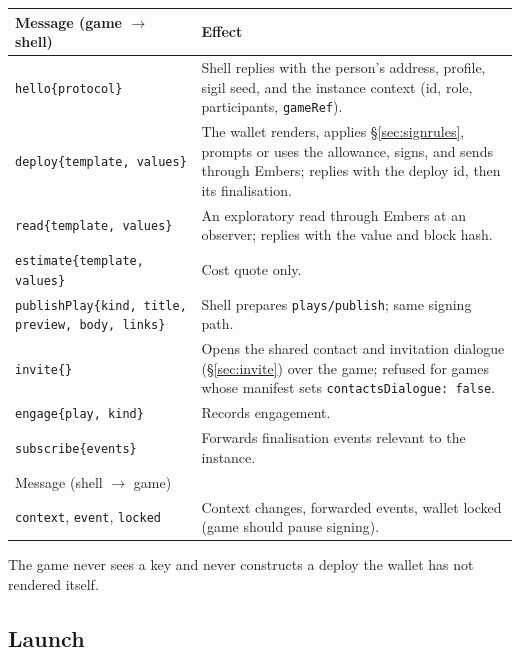 \documentclass[11pt]{article}
\theoremstyle{definition}
\theoremstyle{remark}
\newcommand{\code}[1]{\texttt{#1}}
\newcommand{\Em}{Embers}
\begin{document}
\begin{longtable}{@{}>{\raggedright\arraybackslash}p{}>{\raggedright\arraybackslash}p{}@{}}
\toprule
Message (game $\to$ shell) & Effect\\
\midrule
\endhead
\code{hello\{protocol\}} & Shell replies with the person's address, profile,
  sigil seed, and the instance context (id, role, participants, \code{gameRef}).\\
\code{deploy\{template, values\}} & The wallet renders, applies
  \S\ref{sec:signrules}, prompts or uses the allowance, signs, and sends through \Em{};
  replies with the deploy id, then its finalisation.\\
\code{read\{template, values\}} & An exploratory read through \Em{} at an observer;
  replies with the value and block hash.\\
\code{estimate\{template, values\}} & Cost quote only.\\
\code{publishPlay\{kind, title, preview, body, links\}} & Shell prepares
  \code{plays/publish}; same signing path.\\
\code{invite\{\}} & Opens the shared contact and invitation dialogue
  (\S\ref{sec:invite}) over the game; refused for games whose manifest sets
  \code{contactsDialogue: false}.\\
\code{engage\{play, kind\}} & Records engagement.\\
\code{subscribe\{events\}} & Forwards finalisation events relevant to the
  instance.\\
\midrule
Message (shell $\to$ game) & \\
\midrule
\code{context}, \code{event}, \code{locked} & Context changes, forwarded events,
  wallet locked (game should pause signing).\\
\bottomrule
\end{longtable}

The game never sees a key and never constructs a deploy the wallet has not rendered
itself.

\subsection{Launch}
\end{document}
